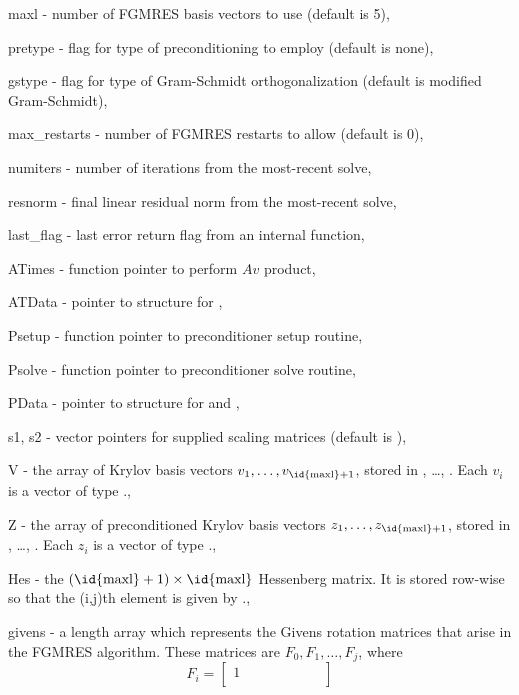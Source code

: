 \begin{args}
  \item[maxl] - number of FGMRES basis vectors to use (default is 5),
  \item[pretype] - flag for type of preconditioning to employ
    (default is none),
  \item[gstype] - flag for type of Gram-Schmidt orthogonalization
    (default is modified Gram-Schmidt),
  \item[max\_restarts] - number of FGMRES restarts to allow
    (default is 0),
  \item[numiters] - number of iterations from the most-recent solve,
  \item[resnorm] - final linear residual norm from the most-recent solve,
  \item[last\_flag] - last error return flag from an internal function,
  \item[ATimes] - function pointer to perform $Av$ product,
  \item[ATData] - pointer to structure for ,
  \item[Psetup] - function pointer to preconditioner setup routine,
  \item[Psolve] - function pointer to preconditioner solve routine,
  \item[PData] - pointer to structure for  and ,
  \item[s1, s2] - vector pointers for supplied scaling matrices
    (default is ),
  \item[V] - the array of Krylov basis vectors
    $v_1, \ldots, v_{\text{\id{maxl}}+1}$, stored in ,
    \ldots, . Each $v_i$ is a vector of type {\nvector}.,
  \item[Z] - the array of preconditioned Krylov basis vectors
    $z_1, \ldots, z_{\text{\id{maxl}}+1}$, stored in ,
    \ldots, . Each $z_i$ is a vector of type {\nvector}.,
  \item[Hes] - the $(\text{\id{maxl}}+1)\times\text{\id{maxl}}$
    Hessenberg matrix. It is stored row-wise so that the (i,j)th
    element is given by .,
  \item[givens] - a length  array which represents the
    Givens rotation matrices that arise in the FGMRES algorithm. These
    matrices are $F_0, F_1, \ldots, F_j$, where
    \begin{equation*}
    F_i = \begin{bmatrix}
      1 &        &   &     &      &   &        &   \\

\end{bmatrix}
\end{equation*}
\end{args}
